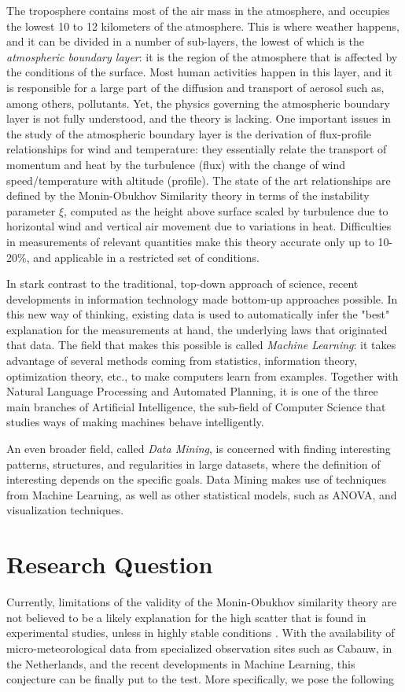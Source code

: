 \documentclass[a4paper]{book}
\begin{document}
The troposphere contains most of the air mass in the atmosphere, and occupies the lowest 10 to 12 kilometers of the atmosphere. This is where weather happens, and it can be divided in a number of sub-layers, the lowest of which is the \emph{atmospheric boundary layer}: it is the region of the atmosphere that is affected by the conditions of the surface. Most human activities happen in this layer, and it is responsible for a large part of the diffusion and transport of aerosol such as, among others, pollutants. Yet, the physics governing the atmospheric boundary layer is not fully understood, and the theory is lacking. One important issues in the study of the atmospheric boundary layer is the derivation of flux-profile relationships for wind and temperature: they essentially relate the transport of momentum and heat by the turbulence (flux) with the change of wind speed/temperature with altitude (profile). The state of the art relationships are defined by the Monin-Obukhov Similarity theory in terms of the instability parameter $\xi$, computed as the height above surface scaled by turbulence due to horizontal wind and vertical air movement due to variations in heat. Difficulties in measurements of relevant quantities make this theory accurate only up to 10-20\%, and applicable in a restricted set of conditions.

In stark contrast to the traditional, top-down approach of science, recent developments in information technology made bottom-up approaches possible. In this new way of thinking, existing data is used to automatically infer the "best" explanation for the measurements at hand, the underlying laws that originated that data. The field that makes this possible is called \emph{Machine Learning}: it takes advantage of several methods coming from statistics, information theory, optimization theory, etc., to make computers learn from examples. Together with Natural Language Processing and Automated Planning, it is one of the three main branches of Artificial Intelligence, the sub-field of Computer Science that studies ways of making machines behave intelligently.

An even broader field, called \emph{Data Mining}, is concerned with finding interesting patterns, structures, and regularities in large datasets, where the definition of interesting depends on the specific goals. Data Mining makes use of techniques from Machine Learning, as well as other statistical models, such as ANOVA, and visualization techniques.

\section{Research Question}
\label{sec:research_question}
Currently, limitations of the validity of the Monin-Obukhov similarity theory are not believed to be a likely explanation for the high scatter that is found in experimental studies, unless in highly stable conditions \citep{basicatm}. With the availability of micro-meteorological data from specialized observation sites such as Cabauw, in the Netherlands, and the recent developments in Machine Learning, this conjecture can be finally put to the test. More specifically, we pose the following \\
\end{document}

